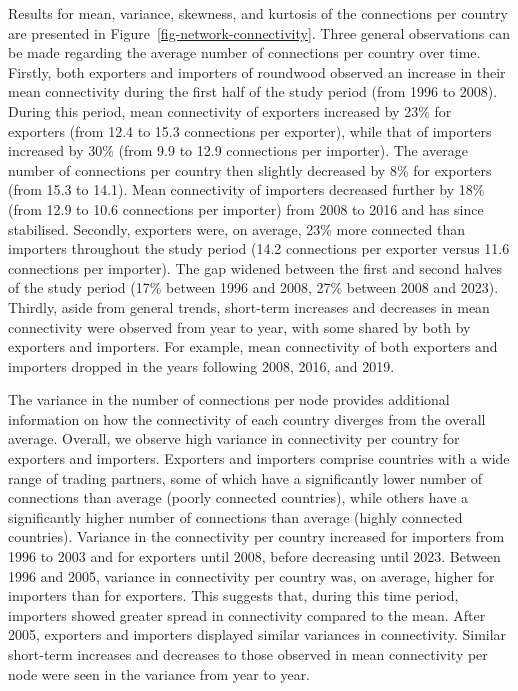 \documentclass[
  authoryear,
  review,
  3p]{elsarticle}
\begin{document}
Results for mean, variance, skewness, and kurtosis of the connections
per country are presented in Figure~\ref{fig-network-connectivity}.
Three general observations can be made regarding the average number of
connections per country over time. Firstly, both exporters and importers
of roundwood observed an increase in their mean connectivity during the
first half of the study period (from 1996 to 2008). During this period,
mean connectivity of exporters increased by 23\% for exporters (from
12.4 to 15.3 connections per exporter), while that of importers
increased by 30\% (from 9.9 to 12.9 connections per importer). The
average number of connections per country then slightly decreased by 8\%
for exporters (from 15.3 to 14.1). Mean connectivity of importers
decreased further by 18\% (from 12.9 to 10.6 connections per importer)
from 2008 to 2016 and has since stabilised. Secondly, exporters were, on
average, 23\% more connected than importers throughout the study period
(14.2 connections per exporter versus 11.6 connections per importer).
The gap widened between the first and second halves of the study period
(17\% between 1996 and 2008, 27\% between 2008 and 2023). Thirdly, aside
from general trends, short-term increases and decreases in mean
connectivity were observed from year to year, with some shared by both
by exporters and importers. For example, mean connectivity of both
exporters and importers dropped in the years following 2008, 2016, and
2019.

The variance in the number of connections per node provides additional
information on how the connectivity of each country diverges from the
overall average. Overall, we observe high variance in connectivity per
country for exporters and importers. Exporters and importers comprise
countries with a wide range of trading partners, some of which have a
significantly lower number of connections than average (poorly connected
countries), while others have a significantly higher number of
connections than average (highly connected countries). Variance in the
connectivity per country increased for importers from 1996 to 2003 and
for exporters until 2008, before decreasing until 2023. Between 1996 and
2005, variance in connectivity per country was, on average, higher for
importers than for exporters. This suggests that, during this time
period, importers showed greater spread in connectivity compared to the
mean. After 2005, exporters and importers displayed similar variances in
connectivity. Similar short-term increases and decreases to those
observed in mean connectivity per node were seen in the variance from
year to year.
\end{document}
